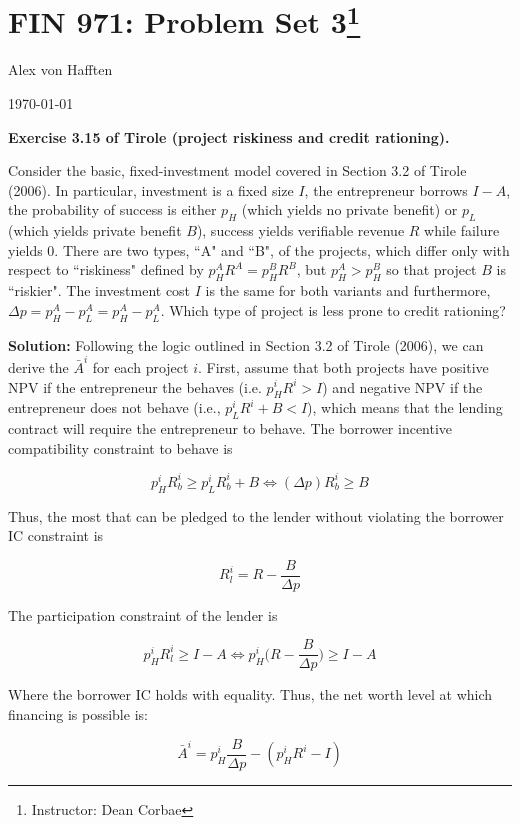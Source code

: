 \documentclass{article}
\begin{document}
\section*{FIN 971: Problem Set 3\footnote{Instructor: Dean Corbae}}

Alex von Hafften

\today

\bigskip

\textbf{Exercise 3.15 of Tirole (project riskiness and credit rationing).} 

\bigskip

Consider the basic, fixed-investment model covered in Section 3.2 of Tirole (2006). In particular, investment is a fixed size $I$, the entrepreneur borrows $I-A$, the probability of success is either $p_H$ (which yields no private benefit) or $p_L$ (which yields private benefit $B$), success yields verifiable revenue $R$ while failure yields 0. There are two types, ``A" and ``B", of the projects, which differ only with respect to ``riskiness" defined by $p^A_HR^A = p^B_HR^B$, but $p^A_H > p^B_H$ so that project $B$ is ``riskier".  The investment cost $I$ is the same for both variants and furthermore, $\Delta p = p^A_H - p^A_L= p^A_H - p^A_L$. Which type of project is less prone to credit rationing?

\bigskip

\textbf{Solution:} Following the logic outlined in Section 3.2 of Tirole (2006), we can derive the $\bar{A}^i$ for each project $i$.  First, assume that both projects have positive NPV if the entrepreneur the behaves (i.e. $p_H^i R^i > I$) and negative NPV if the entrepreneur does not behave (i.e., $p_L^i R^i + B < I$), which means that the lending contract will require the entrepreneur to behave.  The borrower incentive compatibility constraint to behave is 

$$
p_H^i R_b^i \ge p_L^i R_b^i + B \iff (\Delta p) R_b^i \ge B
$$

Thus, the most that can be pledged to the lender without violating the borrower IC constraint is

$$
R_l^i = R -\frac{B}{\Delta p}
$$

The participation constraint of the lender is

$$
p_H^i R_l^i \ge I - A \iff p_H^i \Bigg( R -\frac{B}{\Delta p} \Bigg) \ge I - A
$$

Where the borrower IC holds with equality. Thus, the net worth level at which financing is possible is:

$$
\bar{A}^i = p^i_H \frac{B}{\Delta p } - (p^i_H R^i - I)
$$
\end{document}
